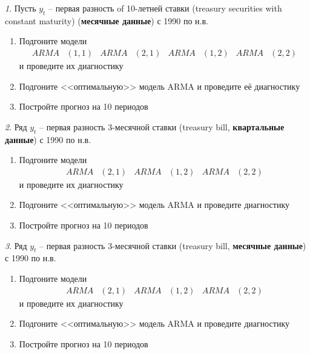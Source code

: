 \documentclass[12pt]{article}
\theoremstyle{remark}
\newtheorem{exercise}{}[subsection]
\begin{document}
\begin{exercise}
Пусть \(y_t\) -- первая разность of 10-летней ставки (treasury securities  with constant maturity) 
(\textbf{месячные данные}) с 1990 по н.в.
\begin{enumerate}
	\item Подгоните модели
	\begin{align*}
		ARMA&(1,1) & ARMA&(2,1) & ARMA&(1,2) & ARMA&(2,2)
	\end{align*} 
	и проведите их диагностику
	\item Подгоните <<оптимальную>> модель ARMA и проведите её диагностику
	\item Постройте прогноз на 10 периодов
\end{enumerate}
\end{exercise}

\begin{exercise}
Ряд \(y_t\) -- первая разность  3-месячной ставки (treasury bill, 
\textbf{квартальные данные}) с 1990 по н.в.
\begin{enumerate}
	\item Подгоните модели
	\begin{align*}
		ARMA&(2,1) & ARMA&(1,2) & ARMA&(2,2)
	\end{align*} 
	и проведите их диагностику
	\item Подгоните <<оптимальную>> модель ARMA и проведите диагностику
	\item Постройте прогноз на 10 периодов
\end{enumerate}
\end{exercise}

\begin{exercise}
Ряд \(y_t\) -- первая разность 3-месячной ставки (treasury bill, 
\textbf{месячные данные}) с 1990 по н.в.
\begin{enumerate}
	\item Подгоните модели
	\begin{align*}
		ARMA&(2,1) & ARMA&(1,2) & ARMA&(2,2)
	\end{align*} 
	и проведите их диагностику
	\item Подгоните <<оптимальную>> модель ARMA и проведите диагностику
	\item Постройте прогноз на 10 периодов
\end{enumerate}
\end{exercise}
\end{document}
